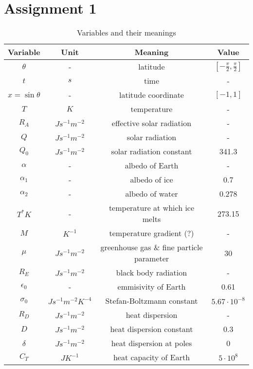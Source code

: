 \section{Assignment 1}

\begin{table}[H]
    \centering
    \begin{tabular}{|c|c|c|c|}
        \hline
        Variable & Unit &  Meaning & Value\\
        \hline
        $\theta$ & - & latitude & $[-\frac{\pi}{2}, \frac{\pi}{2}]$\\
        $t $ & $s$ & time & -\\
        $x = \sin \theta$ & -  & latitude coordinate & $[-1, 1]$\\
        $T $ & $K$ & temperature & -\\
        $R_A $ & $J s^{-1} m^{-2}$ & effective solar radiation & - \\
        $Q $ & $J s^{-1} m^{-2}$ & solar radiation & -\\
        $Q_0 $ & $J s^{-1} m^{-2}$ & solar radiation constant & 341.3\\
        $\alpha$ & - & albedo of Earth & -\\
        $\alpha_1$ & - & albedo of ice & 0.7\\
        $\alpha_2$ & - & albedo of water & 0.278\\
        $T^{*} K$ & - & temperature at which ice melts & 273.15\\
        $M$ & $K^{-1}$ & temperature gradient (?) & -\\
        $\mu $ & $J s^{-1} m^{-2}$ & greenhouse gas \& fine particle parameter & 30\\
        $R_E $ & $J s^{-1} m^{-2}$ & black body radiation & -\\
        $\epsilon_0$ & - & emmisivity of Earth & 0.61\\
        $\sigma_0 $ & $J s^{-1} m^{-2} K^{-4}$ & Stefan-Boltzmann constant & $5.67 \cdot 10^{-8}$\\
        $R_D $ & $J s^{-1} m^{-2}$ & heat dispersion & -\\
        $D $ & $J s^{-1} m^{-2}$ & heat dispersion constant & 0.3\\
        $\delta $ & $J s^{-1} m^{-2}$ & heat dispersion at poles & 0\\
        $C_T $ & $J K^{-1}$  & heat capacity of Earth & $5 \cdot 10^{8}$\\
        \hline
    \end{tabular}
    \caption{Variables and their meanings}
    \label{tab:vars}
\end{table}

